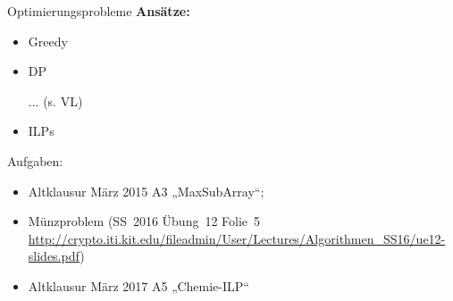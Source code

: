 \begin{frame}{Optimierungsprobleme}
	\textbf{Ansätze:}
	\begin{itemize}
		\item Greedy
		\item DP
		\item[...] (s. VL)
		\item ILPs
	\end{itemize}
	\forcenewline
	{\small Aufgaben: 
		\begin{itemize}
			\item Altklausur März 2015 A3 „MaxSubArray“;
			\item Münzproblem (SS~2016 Übung~12 Folie~5 \\ {\footnotesize \url{http://crypto.iti.kit.edu/fileadmin/User/Lectures/Algorithmen\_SS16/ue12-slides.pdf}})
			\item Altklausur März 2017 A5 „Chemie-ILP“
		\end{itemize}
	}
\end{frame}



